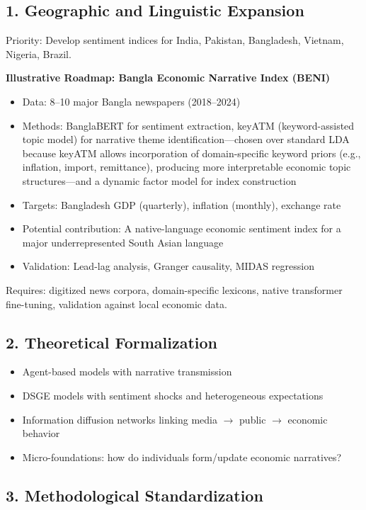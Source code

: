\documentclass[11pt,twocolumn]{article}
\begin{document}
\subsection{1. Geographic and Linguistic Expansion}

Priority: Develop sentiment indices for India, Pakistan, Bangladesh, Vietnam, Nigeria, Brazil.

\textbf{Illustrative Roadmap: Bangla Economic Narrative Index (BENI)}
\begin{itemize}
\item Data: 8--10 major Bangla newspapers (2018--2024)
\item Methods: BanglaBERT for sentiment extraction, keyATM (keyword-assisted topic model) for narrative theme identification---chosen over standard LDA because keyATM allows incorporation of domain-specific keyword priors (e.g., inflation, import, remittance), producing more interpretable economic topic structures---and a dynamic factor model for index construction
\item Targets: Bangladesh GDP (quarterly), inflation (monthly), exchange rate
\item Potential contribution: A native-language economic sentiment index for a major underrepresented South Asian language
\item Validation: Lead-lag analysis, Granger causality, MIDAS regression
\end{itemize}

Requires: digitized news corpora, domain-specific lexicons, native transformer fine-tuning, validation against local economic data.

\subsection{2. Theoretical Formalization}

\begin{itemize}
\item Agent-based models with narrative transmission
\item DSGE models with sentiment shocks and heterogeneous expectations  
\item Information diffusion networks linking media $\to$ public $\to$ economic behavior
\item Micro-foundations: how do individuals form/update economic narratives?
\end{itemize}

\subsection{3. Methodological Standardization}
\end{document}
